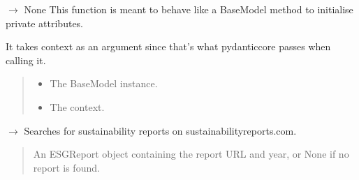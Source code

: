 \documentclass[letterpaper,10pt,english]{sphinxmanual}
\begin{document}
\begin{fulllineitems}
\begin{fulllineitems}
\end{fulllineitems}


\begin{fulllineitems}
\label{\detokenize{src.esg_reports:src.esg_reports.search.Search.model_post_init}}
\pysigstartsignatures
\pysiglinewithargsret
{}
{\sphinxparamcomma {}}
{{ $\rightarrow$ None}}
\pysigstopsignatures
\sphinxAtStartPar
This function is meant to behave like a BaseModel method to initialise private attributes.

\sphinxAtStartPar
It takes context as an argument since that’s what pydantic\sphinxhyphen{}core passes when calling it.
\begin{quote}\begin{description}
\begin{itemize}
\item {} 
\sphinxAtStartPar
{} \textendash{} The BaseModel instance.

\item {} 
\sphinxAtStartPar
{} \textendash{} The context.

\end{itemize}

\end{description}\end{quote}

\end{fulllineitems}


\begin{fulllineitems}
\label{\detokenize{src.esg_reports:src.esg_reports.search.Search.sustainability_reports_dot_com}}
\pysigstartsignatures
\pysiglinewithargsret
{}
{}
{{ $\rightarrow$ {\hyperref[\detokenize{src.data_models:src.data_models.company.ESGReport}]{}}}}
\pysigstopsignatures
\sphinxAtStartPar
Searches for sustainability reports on sustainabilityreports.com.
\begin{quote}\begin{description}
\sphinxAtStartPar
An ESGReport object containing the report URL and year, or None if no report is found.


\end{description}
\end{quote}
\end{fulllineitems}
\end{fulllineitems}
\end{document}
